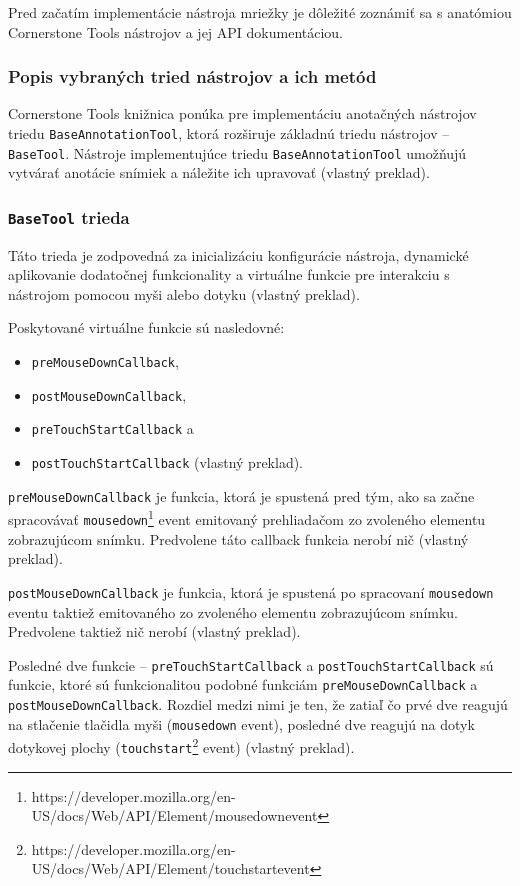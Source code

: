 Pred začatím implementácie nástroja mriežky je dôležité zoznámiť sa s anatómiou Cornerstone Tools nástrojov a jej API dokumentáciou.

\subsubsection {Popis vybraných tried nástrojov a ich metód}
Cornerstone Tools knižnica ponúka pre implementáciu anotačných nástrojov triedu \texttt{BaseAnnotationTool}, ktorá rozširuje základnú triedu nástrojov -- \texttt{BaseTool}. Nástroje implementujúce triedu \texttt{BaseAnnotationTool} umožňujú vytvárať anotácie snímiek a náležite ich upravovať \cite{base_tool_description} (vlastný preklad).

\subsubsection* {\texttt{BaseTool} trieda}
Táto trieda je zodpovedná za inicializáciu konfigurácie nástroja, dynamické aplikovanie dodatočnej funkcionality a virtuálne funkcie pre interakciu s nástrojom pomocou myši alebo dotyku \cite{base_tool_description} (vlastný preklad).

Poskytované virtuálne funkcie sú nasledovné:
\begin {itemize}
\item {\texttt{preMouseDownCallback},}
\item {\texttt{postMouseDownCallback},}
\item {\texttt{preTouchStartCallback} a}
\item {\texttt{postTouchStartCallback} \cite{base_tool_description} (vlastný preklad).}
\end {itemize}

\texttt{preMouseDownCallback} je funkcia, ktorá je spustená pred tým, ako sa začne spracovávať \texttt{mousedown}\footnote{https://developer.mozilla.org/en-US/docs/Web/API/Element/mousedown\textunderscore event} event emitovaný prehliadačom zo zvoleného elementu zobrazujúcom snímku. Predvolene táto callback funkcia nerobí nič \cite{base_tool_description} (vlastný preklad).

\texttt{postMouseDownCallback} je funkcia, ktorá je spustená po spracovaní \texttt{mousedown} eventu taktiež emitovaného zo zvoleného elementu zobrazujúcom snímku. Predvolene taktiež nič nerobí \cite{base_tool_description} (vlastný preklad).

Posledné dve funkcie -- \texttt{preTouchStartCallback} a \texttt{postTouchStartCallback} sú funkcie, ktoré sú funkcionalitou podobné funkciám \texttt{preMouseDownCallback} a \texttt{postMouseDownCallback}. Rozdiel medzi nimi je ten, že zatiaľ čo prvé dve reagujú na stlačenie tlačidla myši (\texttt{mousedown} event), posledné dve reagujú na dotyk dotykovej plochy (\texttt{touchstart}\footnote{https://developer.mozilla.org/en-US/docs/Web/API/Element/touchstart\textunderscore event} event) \cite{base_tool_description} (vlastný preklad).

